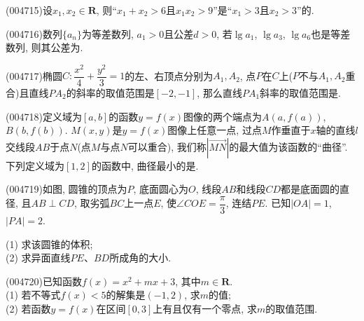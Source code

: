 \item (004715)设$x_1,x_2\in \mathbf{R}$, 则``$x_1+x_2>6$且$x_1x_2>9$''是``$x_1>3$且$x_2>3$''的.
\item (004716)数列$\{a_n\}$为等差数列, $a_1>0$且公差$d>0$, 若$\lg a_1$, $\lg a_3$, $\lg a_6$也是等差数列, 则其公差为.
\item (004717)椭圆$C:\dfrac{x^2}{4}+\dfrac{y^2}{3}=1$的左、右顶点分别为$A_1,A_2$, 点$P$在$C$上($P$不与$A_1,A_2$重合)且直线$PA_2$的斜率的取值范围是$[-2,-1]$, 那么直线$PA_1$斜率的取值范围是.
\item (004718)定义域为$[a,b]$的函数$y=f(x)$图像的两个端点为$A(a,f(a))$, $B(b,f(b))$. $M(x,y)$是$y=f(x)$图像上任意一点, 过点$M$作垂直于$x$轴的直线$l$交线段$AB$于点$N$(点$M$与点$N$可以重合), 我们称$|\overrightarrow{MN}|$的最大值为该函数的``曲径''. 下列定义域为$[1,2]$的函数中, 曲径最小的是.
\item (004719)如图, 圆锥的顶点为$P$, 底面圆心为$O$, 线段$AB$和线段$CD$都是底面圆的直径, 且$AB\perp CD$, 取劣弧$BC$上一点$E$, 使$\angle COE=\dfrac\pi 3$, 连结$PE$. 已知$|OA|=1$, $|PA|=2$.
\begin{center}
\end{center}
(1) 求该圆锥的体积;\\
(2) 求异面直线$PE$、$BD$所成角的大小.
\item (004720)已知函数$f(x)=x^2+mx+3$, 其中$m\in \mathbf{R}$.\\
(1) 若不等式$f(x)<5$的解集是$(-1,2)$, 求$m$的值;\\
(2) 若函数$y=f(x)$在区间$[0,3]$上有且仅有一个零点, 求$m$的取值范围.
